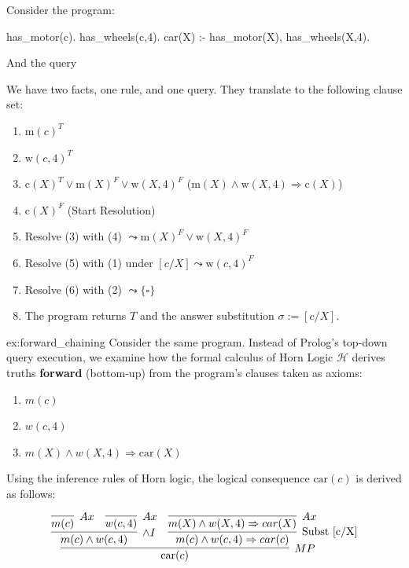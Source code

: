 

\begin{example}[Backchaining]{}
Consider the program:
\begin{codeblock}
has_motor(c).
has_wheels(c,4).
car(X) :- has_motor(X), has_wheels(X,4).
\end{codeblock}   

And the query 

We have two facts, one rule, and one query. They translate to the following clause set:
\begin{enumerate}
    \item $\text{m}(c)^T$
    \item $\text{w}(c,4)^T$
    \item $\text{c}(X)^T \lor \text{m}(X)^F \lor \text{w}(X,4)^F$ \hfill ($\text{m}(X) \land \text{w}(X,4) \Rightarrow \text{c}(X)$)
    \item $\text{c}(X)^F$ \hfill (Start Resolution)
    \item Resolve (3) with (4) $\leadsto \text{m}(X)^F \lor \text{w}(X,4)^F$ 
    \item Resolve (5) with (1) under $[c / X] \leadsto \text{w}(c,4)^F$
    \item Resolve (6) with (2) $\leadsto \{ \square \}$
    \item The program returns $T$ and the answer substitution $\sigma := [c / X]$.
\end{enumerate}
\end{example}

\begin{example}{ex:forward_chaining}
Consider the same program. Instead of Prolog's top-down query execution, we examine how the formal calculus of Horn Logic $\mathcal{H}$ derives truths \textbf{forward} (bottom-up) from the program's clauses taken as axioms:
\begin{enumerate}
    \item $m(c)$
    \item $w(c,4)$
    \item $m(X) \land w(X,4) \Rightarrow \text{car}(X)$
\end{enumerate}   

Using the inference rules of Horn logic, the logical consequence $\text{car}(c)$ is derived as follows:

\[
\infer[MP]{\text{car}(c)}{
    \infer[\land I]{m(c) \land w(c,4)}{
        \infer[Ax]{m(c)}{}
        &
        \infer[Ax]{w(c,4)}{}
    }
    &
    \infer[\text{Subst [c/X]}]{m(c) \land w(c,4) \Rightarrow car(c)}{
        \infer[Ax]{m(X) \land w(X,4) \Rightarrow car(X)}{}
    }
}
\]
\end{example}

